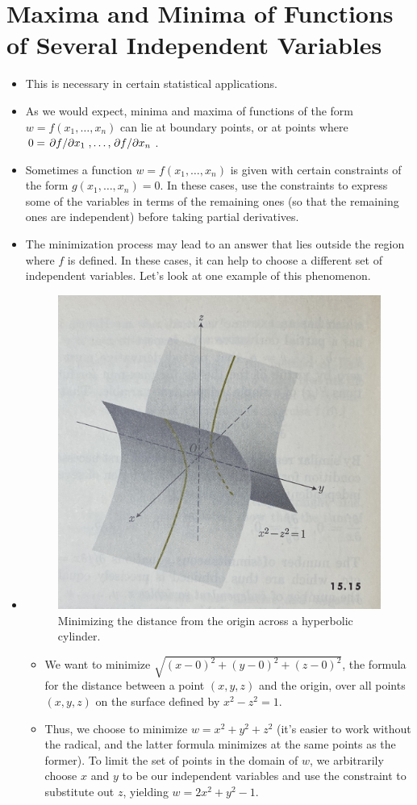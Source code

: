 \documentclass[../main.tex]{subfiles}
\begin{document}
\section{Maxima and Minima of Functions of Several Independent Variables}
\begin{itemize}
    \item This is necessary in certain statistical applications.
    \item As we would expect, minima and maxima of functions of the form $w=f(x_1,\dots,x_n)$ can lie at boundary points, or at points where $0=\pdv*{f}{x_1},\dots,\pdv*{f}{x_n}$.
    \item Sometimes a function $w=f(x_1,\dots,x_n)$ is given with certain constraints of the form $g(x_1,\dots,x_n)=0$. In these cases, use the constraints to express some of the variables in terms of the remaining ones (so that the remaining ones are independent) before taking partial derivatives.
    \item The minimization process may lead to an answer that lies outside the region where $f$ is defined. In these cases, it can help to choose a different set of independent variables. Let's look at one example of this phenomenon.
    \item {}
    \begin{figure}[h!]
        \centering
        \includegraphics[width=0.4\linewidth]{ExtFiles/minimizeHyperbolicCylinder.jpg}
        \caption{Minimizing the distance from the origin across a hyperbolic cylinder.}
        \label{fig:minimizeHyperbolicCylinder}
    \end{figure}
    \begin{itemize}
        \item We want to minimize $\sqrt{(x-0)^2+(y-0)^2+(z-0)^2}$, the formula for the distance between a point $(x,y,z)$ and the origin, over all points $(x,y,z)$ on the surface defined by $x^2-z^2=1$.
        \item Thus, we choose to minimize $w=x^2+y^2+z^2$ (it's easier to work without the radical, and the latter formula minimizes at the same points as the former). To limit the set of points in the domain of $w$, we arbitrarily choose $x$ and $y$ to be our independent variables and use the constraint to substitute out $z$, yielding $w=2x^2+y^2-1$.

\end{itemize}
\end{itemize}
\end{document}
